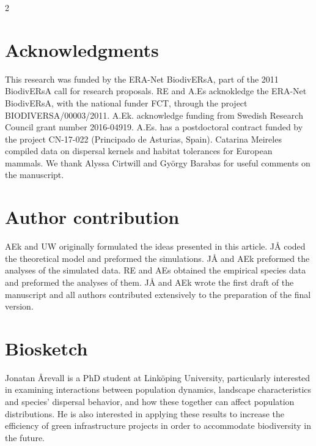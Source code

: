 \documentclass[12pt,pdftex]{article}
\begin{document}
\begin{spacing}{2}
\section*{Acknowledgments}
This research was funded by the ERA-Net BiodivERsA, part of the 2011 BiodivERsA call for research proposals. RE and A.Es acknokledge the ERA-Net
BiodivERsA, with the national funder FCT, through the project BIODIVERSA/00003/2011. A.Ek. acknowledge funding from Swedish Research Council grant number 2016-04919. A.Es. has a postdoctoral contract funded by the project CN-17-022 (Principado de Asturias, Spain). Catarina Meireles compiled data on dispersal kernels and habitat tolerances for European mammals. We thank Alyssa Cirtwill and Gy\"{o}rgy Barabas for useful comments on the manuscript. 

%
     
%


 
\clearpage

\section*{Author contribution}
AEk and UW originally formulated the ideas presented in this article. J\r{A} coded the theoretical model and preformed the simulations. J\r{A} and AEk preformed the analyses of the simulated data. RE and AEs obtained the empirical species data and preformed the  analyses of them. J\r{A} and AEk wrote the first draft of the manuscript and all authors contributed extensively to the preparation of the final version.

\section*{Biosketch}
Jonatan \r{A}revall is a PhD student at Link\"{o}ping University, particularly interested in examining interactions between population dynamics, landscape characteristics and species’ dispersal behavior, and how these together can affect population distributions. He is also interested in applying these results to increase the efficiency of green infrastructure projects in order to accommodate biodiversity in the future.


\end{spacing}
\end{document}
